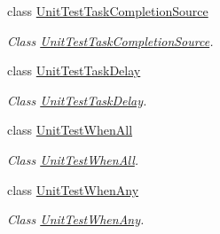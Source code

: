 \begin{DoxyCompactItemize}
class \hyperlink{class_minimu_async_bridge_unit_test_1_1_unit_test_task_completion_source}{Unit\+Test\+Task\+Completion\+Source}
\begin{DoxyCompactList}\small\item\em Class \hyperlink{class_minimu_async_bridge_unit_test_1_1_unit_test_task_completion_source}{Unit\+Test\+Task\+Completion\+Source}. \end{DoxyCompactList}\item 
class \hyperlink{class_minimu_async_bridge_unit_test_1_1_unit_test_task_delay}{Unit\+Test\+Task\+Delay}
\begin{DoxyCompactList}\small\item\em Class \hyperlink{class_minimu_async_bridge_unit_test_1_1_unit_test_task_delay}{Unit\+Test\+Task\+Delay}. \end{DoxyCompactList}\item 
class \hyperlink{class_minimu_async_bridge_unit_test_1_1_unit_test_when_all}{Unit\+Test\+When\+All}
\begin{DoxyCompactList}\small\item\em Class \hyperlink{class_minimu_async_bridge_unit_test_1_1_unit_test_when_all}{Unit\+Test\+When\+All}. \end{DoxyCompactList}\item 
class \hyperlink{class_minimu_async_bridge_unit_test_1_1_unit_test_when_any}{Unit\+Test\+When\+Any}
\begin{DoxyCompactList}\small\item\em Class \hyperlink{class_minimu_async_bridge_unit_test_1_1_unit_test_when_any}{Unit\+Test\+When\+Any}. \end{DoxyCompactList}\end{DoxyCompactItemize}
